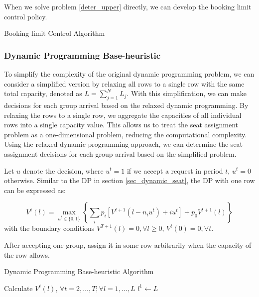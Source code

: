 When we solve problem \eqref{deter_upper} directly, we can develop the booking limit control policy.

\begin{algorithm}[H]
  \caption{Booking limit Control Algorithm}\label{algo_booking}
\end{algorithm}


\subsubsection*{Dynamic Programming Base-heuristic}
To simplify the complexity of the original dynamic programming problem, we can consider a simplified version by relaxing all rows to a single row with the same total capacity, denoted as $L = \sum_{j=1}^{N} L_j$. With this simplification, we can make decisions for each group arrival based on the relaxed dynamic programming. By relaxing the rows to a single row, we aggregate the capacities of all individual rows into a single capacity value. This allows us to treat the seat assignment problem as a one-dimensional problem, reducing the computational complexity. Using the relaxed dynamic programming approach, we can determine the seat assignment decisions for each group arrival based on the simplified problem.


Let $u$ denote the decision, where $u^{t} = 1$ if we accept a request in period $t$, $u^{t} =0$ otherwise. Similar to the DP in section \ref{sec_dynamic_seat}, the DP with one row can be expressed as:

$$V^{t}(l) =  \max_{u^{t} \in \{0,1\}} \left\{ \sum_{i} p_i [V^{t+1}(l-n_i u^{t})+ i u^{t}] + p_0 V^{t+1}(l)\right\} $$
with the boundary conditions $V^{T+1}(l) =0, \forall l \geq 0$, $V^{t}(0) =0, \forall t$.

After accepting one group, assign it in some row arbitrarily when the capacity of the row allows.

\begin{algorithm}[H]
  \caption{Dynamic Programming Base-heuristic Algorithm}\label{algo_dp_heuris}
  Calculate $V^{t}(l)$, $\forall t =2, \ldots, T; \forall l = 1, \ldots, L$\;
  $l^{1} \gets L$\;
\end{algorithm}

